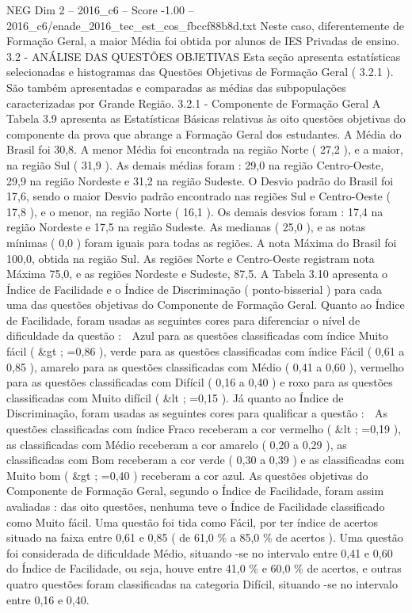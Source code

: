 \begin{textsample}{NEG Dim 2 – 2016\_c6 – Score -1.00 – 2016\_c6/enade\_2016\_tec\_est\_cos\_fbccf88b8d.txt}
Neste caso, diferentemente de Formação Geral, a maior Média foi obtida por alunos de IES Privadas de ensino. 3.2 - ANÁLISE DAS QUESTÕES OBJETIVAS Esta seção apresenta estatísticas selecionadas e histogramas das Questões Objetivas de Formação Geral ( 3.2.1 ).
São também apresentadas e comparadas as médias das subpopulações caracterizadas por Grande Região. 3.2.1 - Componente de Formação Geral A Tabela 3.9 apresenta as Estatísticas Básicas relativas às oito questões objetivas do componente da prova que abrange a Formação Geral dos estudantes.
A Média do Brasil foi 30,8.
A menor Média foi encontrada na região Norte ( 27,2 ), e a maior, na região Sul ( 31,9 ).
As demais médias foram : 29,0 na região Centro-Oeste, 29,9 na região Nordeste e 31,2 na região Sudeste.
O Desvio padrão do Brasil foi 17,6, sendo o maior Desvio padrão encontrado nas regiões Sul e Centro-Oeste ( 17,8 ), e o menor, na região Norte ( 16,1 ).
Os demais desvios foram : 17,4 na região Nordeste e 17,5 na região Sudeste.
As medianas ( 25,0 ), e as notas mínimas ( 0,0 ) foram iguais para todas as regiões.
A nota Máxima do Brasil foi 100,0, obtida na região Sul.
As regiões Norte e Centro-Oeste registram nota Máxima 75,0, e as regiões Nordeste e Sudeste, 87,5.
A Tabela 3.10 apresenta o Índice de Facilidade e o Índice de Discriminação ( ponto-bisserial ) para cada uma das questões objetivas do Componente de Formação Geral.
Quanto ao Índice de Facilidade, foram usadas as seguintes cores para diferenciar o nível de dificuldade da questão :  Azul para as questões classificadas com índice Muito fácil ( \&gt ; =0,86 ), verde para as questões classificadas com índice Fácil ( 0,61 a 0,85 ), amarelo para as questões classificadas com Médio ( 0,41 a 0,60 ), vermelho para as questões classificadas com Difícil ( 0,16 a 0,40 ) e roxo para as questões classificadas com Muito difícil ( \&lt ; =0,15 ).
Já quanto ao Índice de Discriminação, foram usadas as seguintes cores para qualificar a questão :  As questões classificadas com índice Fraco receberam a cor vermelho ( \&lt ; =0,19 ), as classificadas com Médio receberam a cor amarelo ( 0,20 a 0,29 ), as classificadas com Bom receberam a cor verde ( 0,30 a 0,39 ) e as classificadas com Muito bom ( \&gt ; =0,40 ) receberam a cor azul.
As questões objetivas do Componente de Formação Geral, segundo o Índice de Facilidade, foram assim avaliadas : das oito questões, nenhuma teve o Índice de Facilidade classificado como Muito fácil.
Uma questão foi tida como Fácil, por ter índice de acertos situado na faixa entre 0,61 e 0,85 ( de 61,0 \% a 85,0 \% de acertos ).
Uma questão foi considerada de dificuldade Médio, situando -se no intervalo entre 0,41 e 0,60 do Índice de Facilidade, ou seja, houve entre 41,0 \% e 60,0 \% de acertos, e outras quatro questões foram classificadas na categoria Difícil, situando -se no intervalo entre 0,16 e 0,40.

\end{textsample}

